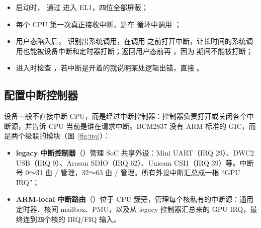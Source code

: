 \begin{itemize}
  \item 启动时， 通过  进入 EL1，四位全部屏蔽；
  \item 每个 CPU 第一次真正接收中断，是在  循环中调用 ；
  \item 用户态陷入后， 识别出系统调用，在调用  之前打开中断，让长时间的系统调用也能被设备中断和定时器打断；返回用户态前再 ，因为  期间不能被打断；
  \item {} 进入时检查 ，若中断是开着的就说明某处逻辑出错，直接 。
\end{itemize}

\subsection{配置中断控制器}

设备一般不直接中断 CPU，而是经过中断控制器：控制器负责打开或关闭各个中断源，并告诉 CPU 当前是谁在请求中断。BCM2837 没有 ARM 标准的 GIC，而是两个级联的模块（图~\ref{fig:irq}）：

\begin{itemize}
  \item \textbf{legacy 中断控制器}（）管理 SoC 共享外设：Mini UART（IRQ 29）、DWC2 USB（IRQ 9）、Arasan SDIO（IRQ 62）、Unicam CSI1（IRQ 39）等。中断号 0～31 由 / 管理，32～63 由 / 管理。所有外设中断汇总成一根 “GPU IRQ”；
  \item \textbf{ARM-local 中断路由}（）位于 CPU 簇旁，管理每个核私有的中断源：通用定时器、核间 mailbox、PMU，以及从 legacy 控制器汇总来的 GPU IRQ，最终连到四个核的 IRQ/FIQ 输入。
\end{itemize}

